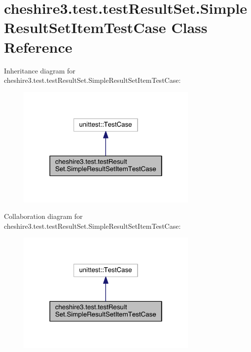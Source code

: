 \hypertarget{classcheshire3_1_1test_1_1test_result_set_1_1_simple_result_set_item_test_case}{\section{cheshire3.\-test.\-test\-Result\-Set.\-Simple\-Result\-Set\-Item\-Test\-Case Class Reference}
\label{classcheshire3_1_1test_1_1test_result_set_1_1_simple_result_set_item_test_case}
}


Inheritance diagram for cheshire3.\-test.\-test\-Result\-Set.\-Simple\-Result\-Set\-Item\-Test\-Case\-:
\nopagebreak
\begin{figure}[H]
\begin{center}
\leavevmode
\includegraphics[width=250pt]{classcheshire3_1_1test_1_1test_result_set_1_1_simple_result_set_item_test_case__inherit__graph}
\end{center}
\end{figure}


Collaboration diagram for cheshire3.\-test.\-test\-Result\-Set.\-Simple\-Result\-Set\-Item\-Test\-Case\-:
\nopagebreak
\begin{figure}[H]
\begin{center}
\leavevmode
\includegraphics[width=250pt]{classcheshire3_1_1test_1_1test_result_set_1_1_simple_result_set_item_test_case__coll__graph}
\end{center}
\end{figure}
